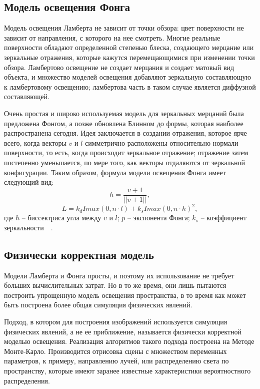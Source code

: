 \subsection{Модель освещения Фонга}
Модель освещения Ламберта не зависит от точки обзора: цвет поверхности не 
зависит от направления, с которого на нее смотреть. Многие реальные поверхности 
обладают определенной степенью блеска, создающего мерцание или зеркальные отражения, 
которые кажутся перемещающимися при изменении точки обзора. 
Ламбертово освещение не создает мерцания и создает матовый вид объекта, 
и множество моделей освещения добавляют зеркальную 
составляющую к ламбертовому освещению; ламбертова часть в таком случае 
является диффузной составляющей. 

Очень простая и широко используемая модель для зеркальных мерцаний была 
предложена Фонгом, а позже обновлена Блинном до 
формы, которая наиболее распространена сегодня. Идея заключается в создании 
отражения, которое ярче всего, когда векторы $v$ и $l$ симметрично расположены 
относительно нормали поверхности, то есть, когда происходит зеркальное 
отражение; отражение затем постепенно уменьшается, по мере того, 
как векторы отдаляются от зеркальной конфигурации. Таким образом, формула модели
освещения Фонга имеет следующий вид:
\begin{equation}
    h = \frac{v + 1}{||v+1||},
\end{equation}
\begin{equation}
    L = k_d I max(0, n \cdot l) + k_s I max(0, n \cdot  h)^2,
\end{equation}
где $h$ -- биссектриса угла между $v$ и $l$; $p$ -- экспонента Фонга; $k_s$ -- коэффициент зеркальности~\cite{IFCGP}~\cite{FoCG}.

\subsection{Физически корректная модель}

Модели Ламберта и Фонга просты, и поэтому их использование не требует больших вычислительных
затрат. Но в то же время, они лишь пытаются построить упрощенную модель освещения пространства, в то время как может быть построена более общая симуляция физических явлений.

Подход, в котором для построения изображений используется симуляция физических 
явлений, а не ее приближение, называется физически корректной моделью освещения.
Реализация алгоритмов такого подхода построена на Методе Монте-Карло. Производится
отрисовка сцены с множеством переменных параметров, к примеру, направлению лучей,
или распределению света по пространству, которые имеют заранее известные 
характеристики вероятностного распределения.

